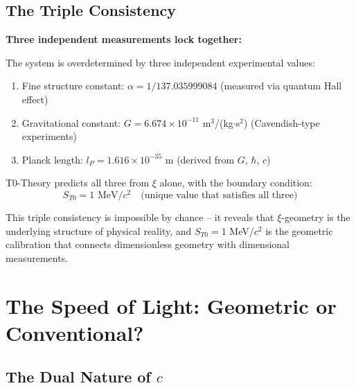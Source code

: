 \documentclass[12pt,a4paper]{article}
\begin{document}
	\subsection{The Triple Consistency}
	
	\begin{insight}
		\textbf{Three independent measurements lock together:}
		
		The system is overdetermined by three independent experimental values:
		\begin{enumerate}
			\item Fine structure constant: $\alpha = 1/137.035999084$ (measured via quantum Hall effect)
			\item Gravitational constant: $G = 6.674 \times 10^{-11}$ m$^3$/(kg$\cdot$s$^2$) (Cavendish-type experiments)
			\item Planck length: $l_P = 1.616 \times 10^{-35}$ m (derived from $G$, $\hbar$, $c$)
		\end{enumerate}
		
		T0-Theory predicts all three from $\xi$ alone, with the boundary condition:
		\begin{equation}
			S_{T0} = 1 \text{ MeV}/c^2 \quad \text{(unique value that satisfies all three)}
		\end{equation}
		
		This triple consistency is impossible by chance -- it reveals that $\xi$-geometry is the underlying structure of physical reality, and $S_{T0} = 1$ MeV/$c^2$ is the geometric calibration that connects dimensionless geometry with dimensional measurements.
	\end{insight}
	
	\section{The Speed of Light: Geometric or Conventional?}
	
	\subsection{The Dual Nature of $c$}
	
\end{document}
